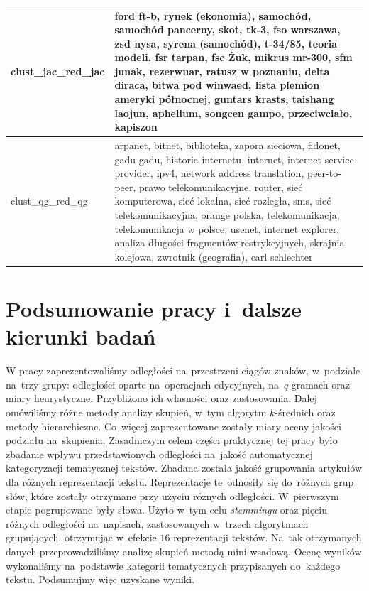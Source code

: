 \documentclass{praca1}
\begin{document}
\begin{longtable}{|L{0.5cm}|L{15cm}|}
   \hline
\begin{sideways}clust\_jac\_red\_jac\end{sideways} & ford ft-b, rynek (ekonomia), samochód, samochód pancerny, skot, tk-3, fso warszawa, zsd nysa, syrena (samochód), t-34/85, teoria modeli, fsr tarpan, fsc Żuk, mikrus mr-300, sfm junak, rezerwuar, ratusz w poznaniu, delta diraca, bitwa pod winwaed, lista plemion ameryki północnej, guntars krasts, taishang laojun, aphelium, songcen gampo, przeciwciało, kapiszon \\ %
   \hline
\begin{sideways}clust\_qg\_red\_qg\end{sideways} & arpanet, bitnet, biblioteka, zapora sieciowa, fidonet, gadu-gadu, historia internetu, internet, internet service provider, ipv4, network address translation, peer-to-peer, prawo telekomunikacyjne, router, sieć komputerowa, sieć lokalna, sieć rozległa, sms, sieć telekomunikacyjna, orange polska, telekomunikacja, telekomunikacja w polsce, usenet, internet explorer, analiza długości fragmentów restrykcyjnych, skrajnia kolejowa, zwrotnik (geografia), carl schlechter \\ %
   \hline
\end{longtable}
\restoregeometry
\chapter{Podsumowanie pracy i~dalsze kierunki badań}

W pracy zaprezentowaliśmy odległości na~przestrzeni ciągów znaków, w~podziale na~trzy grupy: odległości oparte na~operacjach edycyjnych, na~$q$-gramach oraz miary heurystyczne. Przybliżono ich własności oraz zastosowania. Dalej omówiliśmy różne metody analizy skupień, w~tym algorytm $k$-średnich oraz metody hierarchiczne. Co~więcej zaprezentowane zostały miary oceny jakości podziału na~skupienia. Zasadniczym celem części praktycznej tej pracy było zbadanie wpływu przedstawionych odległości na~jakość automatycznej kategoryzacji tematycznej tekstów. Zbadana została jakość grupowania artykułów dla różnych reprezentacji tekstu. Reprezentacje te~odnosiły się do~różnych grup słów, które zostały otrzymane przy użyciu różnych odległości. W~pierwszym etapie pogrupowane były słowa. Użyto w~tym celu \emph{stemmingu} oraz pięciu różnych odległości na~napisach, zastosowanych w~trzech algorytmach grupujących, otrzymując w~efekcie $16$ reprezentacji tekstów. Na~tak otrzymanych danych przeprowadziliśmy analizę skupień metodą mini-wsadową. Ocenę wyników wykonaliśmy na~podstawie kategorii tematycznych przypisanych do~każdego tekstu. Podsumujmy więc uzyskane wyniki.
\end{document}
